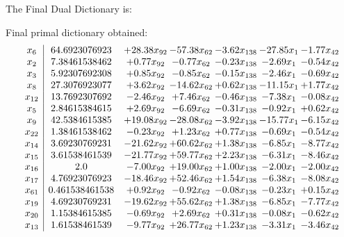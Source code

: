 \documentclass[8pt]{article}
\begin{document}
The Final Dual Dictionary is: 

 Final primal dictionary obtained: 
\[\begin{array}{c| c c@{\hskip 2pt} c@{\hskip 2pt} c@{\hskip 2pt} c@{\hskip 2pt} c@{\hskip 2pt} }
 x_{6}   &  64.6923076923 & + 28.38 x_{92} & -57.38 x_{62} & -3.62 x_{138} & -27.85 x_{1} & -1.77 x_{42}\\
 x_{2}   &  7.38461538462 & +  0.77 x_{92} & -0.77 x_{62} & -0.23 x_{138} & -2.69 x_{1} & -0.54 x_{42}\\
 x_{3}   &  5.92307692308 & +  0.85 x_{92} & -0.85 x_{62} & -0.15 x_{138} & -2.46 x_{1} & -0.69 x_{42}\\
 x_{8}   &  27.3076923077 & +  3.62 x_{92} & -14.62 x_{62} & +  0.62 x_{138} & -11.15 x_{1} & +  1.77 x_{42}\\
 x_{12}   &  13.7692307692 & -2.46 x_{92} & +  7.46 x_{62} & -0.46 x_{138} & -7.38 x_{1} & -0.08 x_{42}\\
 x_{5}   &  2.84615384615 & +  2.69 x_{92} & -6.69 x_{62} & -0.31 x_{138} & -0.92 x_{1} & +  0.62 x_{42}\\
 x_{9}   &  42.5384615385 & + 19.08 x_{92} & -28.08 x_{62} & -3.92 x_{138} & -15.77 x_{1} & -6.15 x_{42}\\
 x_{22}   &  1.38461538462 & -0.23 x_{92} & +  1.23 x_{62} & +  0.77 x_{138} & -0.69 x_{1} & -0.54 x_{42}\\
 x_{14}   &  3.69230769231 & -21.62 x_{92} & + 60.62 x_{62} & +  1.38 x_{138} & -6.85 x_{1} & -8.77 x_{42}\\
 x_{15}   &  3.61538461539 & -21.77 x_{92} & + 59.77 x_{62} & +  2.23 x_{138} & -6.31 x_{1} & -8.46 x_{42}\\
 x_{16}   &  2.0 & -7.00 x_{92} & + 19.00 x_{62} & +  1.00 x_{138} & -2.00 x_{1} & -2.00 x_{42}\\
 x_{17}   &  4.76923076923 & -18.46 x_{92} & + 52.46 x_{62} & +  1.54 x_{138} & -6.38 x_{1} & -8.08 x_{42}\\
 x_{61}   &  0.461538461538 & +  0.92 x_{92} & -0.92 x_{62} & -0.08 x_{138} & -0.23 x_{1} & +  0.15 x_{42}\\
 x_{19}   &  4.69230769231 & -19.62 x_{92} & + 55.62 x_{62} & +  1.38 x_{138} & -6.85 x_{1} & -7.77 x_{42}\\
 x_{20}   &  1.15384615385 & -0.69 x_{92} & +  2.69 x_{62} & +  0.31 x_{138} & -0.08 x_{1} & -0.62 x_{42}\\
 x_{13}   &  1.61538461539 & -9.77 x_{92} & + 26.77 x_{62} & +  1.23 x_{138} & -3.31 x_{1} & -3.46 x_{42}\\

\end{array}\]
\end{document}
